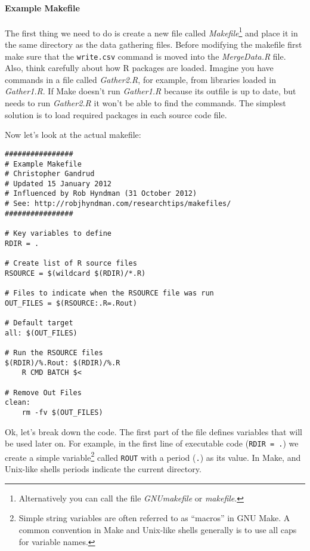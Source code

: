 \paragraph{Example Makefile}

The first thing we need to do is create a new file called \emph{Makefile}\footnote{Alternatively you can call the file \emph{GNUmakefile} or \emph{makefile}.} and place it in the same directory as the data gathering files. Before modifying the makefile first make sure that the \texttt{write.csv} command is moved into the \emph{MergeData.R} file. Also, think carefully about how R packages are loaded. Imagine you have commands in a file called \emph{Gather2.R}, for example, from libraries loaded in \emph{Gather1.R}. If Make doesn't run \emph{Gather1.R} because its outfile is up to date, but needs to run \emph{Gather2.R} it won't be able to find the commands. The simplest solution is to load required packages in each source code file.

Now let's look at the actual makefile:

\begin{knitrout}
	\color{fgcolor}
	\begin{kframe}
		\begin{verbatim}
################
# Example Makefile
# Christopher Gandrud
# Updated 15 January 2012
# Influenced by Rob Hyndman (31 October 2012)
# See: http://robjhyndman.com/researchtips/makefiles/
################

# Key variables to define
RDIR = .

# Create list of R source files
RSOURCE = $(wildcard $(RDIR)/*.R)

# Files to indicate when the RSOURCE file was run
OUT_FILES = $(RSOURCE:.R=.Rout)

# Default target
all: $(OUT_FILES) 

# Run the RSOURCE files
$(RDIR)/%.Rout: $(RDIR)/%.R
    R CMD BATCH $<

# Remove Out Files
clean: 
    rm -fv $(OUT_FILES)
		\end{verbatim}
	\end{kframe}
\end{knitrout}

\noindent Ok, let's break down the code. The first part of the file defines variables that will be used later on. For example, in the first line of executable code (\texttt{RDIR = .}) we create a simple variable\footnote{Simple string variables are often referred to as ``macros'' in GNU Make. A common convention in Make and Unix-like shells generally is to use all caps for variable names.} called \texttt{ROUT} with a period (\texttt{.}) as its value. In Make, and Unix-like shells periods indicate the current directory. 

